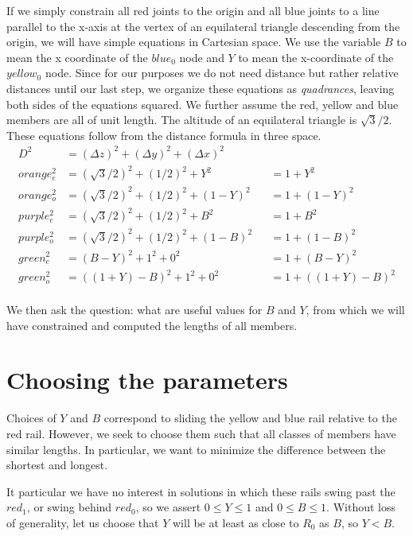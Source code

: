 \documentclass[11pt]{article}
\begin{document}
 If we simply constrain all red joints to the origin and all blue joints to a line parallel to the x-axis at the vertex of an equilateral
 triangle descending from the origin, we will have simple equations in Cartesian space. We use the variable $B$ to mean the x coordinate
 of the $blue_0$ node and $Y$ to mean the x-coordinate of the $yellow_0$ node. Since for our purposes we do not need distance but
 rather relative distances
 until our last step, we organize these equations as \emph{quadrances}, leaving both sides of the equations squared.
 We further assume the red, yellow and blue members are all of unit length. The altitude of an equilateral triangle is $\sqrt{3}/2$.
 These equations follow from the distance formula in three space.
 \begin{align*}
   D^2 &= (\Delta z)^2 + (\Delta y)^2 + (\Delta x)^2 \\
 orange_e^2 &= (\sqrt{3}/2)^2 + (1/2)^2 + Y^2 & &= 1 + Y^2\\
 orange_o^2 &= (\sqrt{3}/2)^2 + (1/2)^2 + (1-Y)^2 & &= 1 + (1-Y)^2\\
 purple_e^2 &= (\sqrt{3}/2)^2 + (1/2)^2 + B^2 & &= 1 + B^2\\
 purple_o^2 &= (\sqrt{3}/2)^2 + (1/2)^2 + (1-B)^2 & &=  1+ (1-B)^2\\
 green_e^2 &= (B - Y)^2 + 1^2 + 0^2 & &= 1 + (B - Y)^2 \\ 
 green_o^2 &= ((1+Y) - B)^2 + 1^2 + 0^2 & &= 1 + ((1+Y) - B)^2 \\ 
\end{align*}

 We then ask the question: what are useful values for $B$ and $Y$, from which we will have constrained and computed the lengths of all
 members.

 \section{Choosing the parameters}

 Choices of $Y$ and $B$ correspond to sliding the yellow and blue rail relative to the red rail. However, we seek to choose them such that all
 classes of members have similar lengths. In particular, we want to minimize the difference between the shortest and longest.

 It particular we have no interest in solutions in which these rails swing past the $red_1$, or swing behind $red_0$, so we
 assert $0 \leq Y \leq 1$ and $0 \leq B \leq 1$. Without loss of generality, let us choose that $Y$ will be at least as close to $R_0$ as $B$,
 so $Y  < B$.
\end{document}
